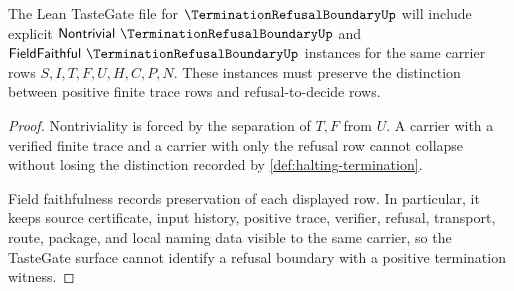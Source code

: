 \begin{theorem}
\label{thm:termination-refusal-boundary-tastegate-obligation}
The Lean TasteGate file for $\TerminationRefusalBoundaryUp$ will include explicit $\mathsf{Nontrivial}\ \TerminationRefusalBoundaryUp$ and $\mathsf{FieldFaithful}\ \TerminationRefusalBoundaryUp$ instances for the same carrier rows $S,I,T,F,U,H,C,P,N$. These instances must preserve the distinction between positive finite trace rows and refusal-to-decide rows.
\end{theorem}
\begin{proof}
Nontriviality is forced by the separation of $T,F$ from $U$. A carrier with a verified finite trace and a carrier with only the refusal row cannot collapse without losing the distinction recorded by \autoref{def:halting-termination}.

Field faithfulness records preservation of each displayed row. In particular, it keeps source certificate, input history, positive trace, verifier, refusal, transport, route, package, and local naming data visible to the same carrier, so the TasteGate surface cannot identify a refusal boundary with a positive termination witness.
\end{proof}



